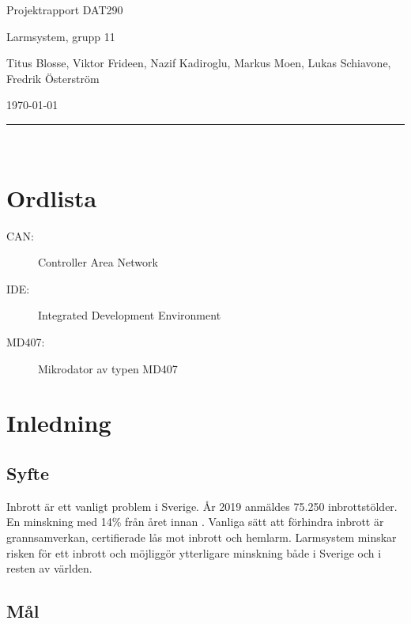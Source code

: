 \documentclass[a4paper]{article}
\newcommand\namn{Larmsystem}
\begin{document}
\thispagestyle{empty}

\begin{center}
    \parskip=14pt
    \vspace*{3\parskip}

    {\LARGE Projektrapport DAT290}

    {\large \namn, grupp 11

    Titus Blosse, Viktor Frideen, Nazif Kadiroglu, Markus Moen, Lukas Schiavone, Fredrik Österström

    \today}

    \rule{7cm}{0.4pt}\\
\end{center}
\newpage

\thispagestyle{empty}

\tableofcontents
\newpage

\thispagestyle{empty}

\section*{Ordlista}

\begin{description}
    \item[CAN:] Controller Area Network
    \item[IDE:] Integrated Development Environment
    \item[MD407:] Mikrodator av typen MD407
\end{description}
\newpage


\section{Inledning}
\subsection{Syfte}
Inbrott är ett vanligt problem i Sverige. År 2019 anmäldes 75.250 inbrottstölder. En minskning med 14\% från året innan \cite{brastold}. Vanliga sätt att förhindra inbrott är grannsamverkan, certifierade lås mot inbrott och hemlarm. Larmsystem minskar risken för ett inbrott och möjliggör ytterligare minskning både i Sverige och i resten av världen.

\subsection{Mål}
\end{document}
